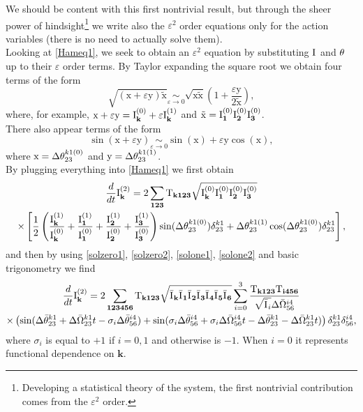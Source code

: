 We should be content with this first nontrivial result, but through the sheer power of hindsight\footnote{Developing a 
statistical theory of the system, the first nontrivial contribution comes from the $\varepsilon^2$ order.}
we write also the 
$\varepsilon^2$ order equations only for the action variables (there is no need to actually solve them). \\
Looking at \eqref{Hameq1}, we seek to obtain an $\varepsilon^2$ equation by substituting $\mathrm{I}^{}$ and $\theta^{}$ up to their $\varepsilon$ order terms. By Taylor expanding the square root 
we obtain four terms of the form
\begin{equation}
    \sqrt{(\mathrm{x} +\varepsilon \mathrm{y})\mathrm{\tilde{x}}} \underset{\varepsilon \rightarrow 0}{\sim} 
    \sqrt{\mathrm{x}\mathrm{\tilde{x}}}\left( 1 + \frac{\varepsilon \mathrm{y}}{2\mathrm{\tilde{x}}}\right),
\end{equation}
where, for example, $\mathrm{x} + \varepsilon \mathrm{y} = \mathrm{I}^{(0)}_\mathbf{k} + \varepsilon \mathrm{I}^{(1)}_\mathbf{k}$ and $\mathrm{\tilde{x}} = \mathrm{I}^{(0)}_\mathbf{1}\mathrm{I}^{(0)}_\mathbf{2}\mathrm{I}^{(0)}_\mathbf{3}$.\\
There also appear terms of the form
\begin{equation}
    \sin(\mathrm{x} + \varepsilon \mathrm{y}) \underset{\varepsilon \rightarrow 0}{\sim} \sin(\mathrm{x}) + \varepsilon \mathrm{y} \cos(\mathrm{x}),
\end{equation} 
where $\mathrm{x} = \Delta\theta^{k1(0)}_{23}$ and $\mathrm{y} = \Delta\theta^{k1(1)}_{23}$.\\
By plugging everything into \eqref{Hameq1} we first obtain
\begin{multline}
    \frac{d}{dt} \mathrm{I}^{(2)}_\mathbf{k} = 2 \sum_{\mathbf{123}} \mathrm{T}_{\mathbf{k123}} \sqrt{\mathrm{I}^{(0)}_\mathbf{k}\mathrm{I}^{(0)}_\mathbf{1}\mathrm{I}^{(0)}_\mathbf{2}\mathrm{I}^{(0)}_\mathbf{3}} \\ \times \left[ \frac{1}{2}\left(\frac{\mathrm{I}^{(1)}_\mathbf{k}}{\mathrm{I}^{(0)}_\mathbf{k}}+\frac{\mathrm{I}^{(1)}_\mathbf{1}}{\mathrm{I}^{(0)}_\mathbf{1}}+
    \frac{\mathrm{I}^{(1)}_\mathbf{2}}{\mathrm{I}^{(0)}_\mathbf{2}}+\frac{\mathrm{I}^{(1)}_\mathbf{3}}{\mathrm{I}^{(0)}_\mathbf{3}} \right)\sin(\Delta\theta^{k1(0)}_{23})\delta^{k1}_{23} + 
    \Delta\theta^{k1(1)}_{23}\cos(\Delta\theta^{k1(0)}_{23}) \delta^{k1}_{23}\right],
\end{multline}
and then by using \eqref{solzero1}, \eqref{solzero2}, \eqref{solone1}, \eqref{solone2} and basic trigonometry we find
\begin{multline}
    \frac{d}{dt} \mathrm{I}^{(2)}_\mathbf{k} = 2 \sum_{\mathbf{123456}}\mathrm{T}_{\mathbf{k123}} \sqrt{\bar{\mathrm{I}^{}}_\mathbf{k}\bar{\mathrm{I}^{}}_\mathbf{1}\bar{\mathrm{I}^{}}_\mathbf{2}\bar{\mathrm{I}^{}}_\mathbf{3}\bar{\mathrm{I}^{}}_\mathbf{4}\bar{\mathrm{I}^{}}_\mathbf{5}\bar{\mathrm{I}^{}}_\mathbf{6}} 
    \sum_{i=0}^{3}\frac{\mathrm{T}_{\mathbf{k123}}\mathrm{T}_\mathbf{i456}}{\sqrt{\bar{\mathrm{I}^{}}_i}\Delta\bar{\Omega}^{i4}_{56}} \\
    \times\left(\sin(\Delta\bar{\theta}^{k1}_{23} + \Delta\bar{\Omega}^{k1}_{23}t - \sigma_i \Delta\bar{\theta}^{i4}_{56}) 
    + \sin(\sigma_i \Delta\bar{\theta}^{i4}_{56} + \sigma_i\Delta\bar{\Omega}^{i4}_{56}t -\Delta\bar{\theta}^{k1}_{23} - \Delta\bar{\Omega}^{k1}_{23}t)  \right)\delta^{k1}_{23}\delta^{i4}_{56}, 
    \label{eqeps2}
\end{multline}
where $\sigma_i$ is equal to $+1$ if $i=0,1$ and otherwise is $-1$. When $i=0$ it represents functional dependence on $\mathbf{k}$.\\

